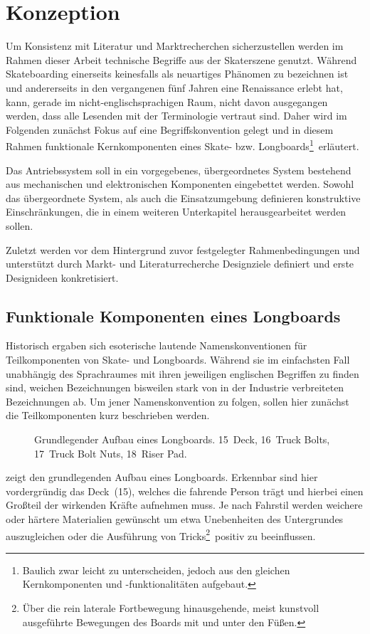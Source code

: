 \chapter{Konzeption}\label{sec:conception}
	Um Konsistenz mit Literatur und Marktrecherchen sicherzustellen werden im Rahmen dieser Arbeit technische Begriffe aus der Skaterszene genutzt.
	Während Skateboarding einerseits keinesfalls als neuartiges Phänomen zu bezeichnen ist und andererseits in den vergangenen fünf Jahren eine Renaissance erlebt hat, kann, gerade im nicht-englischsprachigen Raum, nicht davon ausgegangen werden, dass alle Lesenden mit der Terminologie vertraut sind.
	Daher wird im Folgenden zunächst Fokus auf eine Begriffskonvention gelegt und in diesem Rahmen funktionale Kernkomponenten eines Skate- bzw. Longboards\footnote{\hspace{1mm} Baulich zwar leicht zu unterscheiden, jedoch aus den gleichen Kernkomponenten und -funktionalitäten aufgebaut.}~erläutert.\par\medskip
	Das Antriebssystem soll in ein vorgegebenes, übergeordnetes System bestehend aus mechanischen und elektronischen Komponenten eingebettet werden.
	Sowohl das übergeordnete System, als auch die Einsatzumgebung definieren konstruktive Einschränkungen, die in einem weiteren Unterkapitel herausgearbeitet werden sollen.\par\medskip
	Zuletzt werden vor dem Hintergrund zuvor festgelegter Rahmenbedingungen und unterstützt durch Markt- und Literaturrecherche Designziele definiert und erste Designideen konkretisiert.
	\section{Funktionale Komponenten eines Longboards}
		Historisch ergaben sich esoterische lautende Namenskonventionen für Teilkomponenten von Skate- und Longboards.
		Während sie im einfachsten Fall unabhängig des Sprachraumes mit ihren jeweiligen englischen Begriffen zu finden sind, weichen Bezeichnungen bisweilen stark von in der Industrie verbreiteten Bezeichnungen ab.
		Um jener Namenskonvention zu folgen, sollen hier zunächst die Teilkomponenten kurz beschrieben werden.\par\medskip
		\begin{figure}[h]
			\centering
			
			\caption[Grundlegender Aufbau eines Longboards]{Grundlegender Aufbau eines Longboards. 15~Deck, 16~Truck Bolts, 17~Truck Bolt Nuts, 18~Riser Pad.}\label{fig:longboard}
		\end{figure}
		 zeigt den grundlegenden Aufbau eines Longboards.
		Erkennbar sind hier vordergründig das Deck~(15), welches die fahrende Person trägt und hierbei einen Großteil der wirkenden Kräfte aufnehmen muss.
		Je nach Fahrstil werden weichere oder härtere Materialien gewünscht um etwa Unebenheiten des Untergrundes auszugleichen oder die Ausführung von Tricks\footnote{\hspace{1mm} Über die rein laterale Fortbewegung hinausgehende, meist kunstvoll ausgeführte Bewegungen des Boards mit und unter den Füßen.}~positiv zu beeinflussen.

